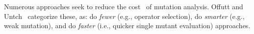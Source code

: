 Numerous approaches seek to reduce the cost~\cite{jia2011analysis} of mutation
analysis. Offutt and Untch~\cite{offutt2001mutation} categorize these,
as: do \textit{fewer} (e.g., operator selection),
do \textit{smarter} (e.g., weak mutation), and do \textit{faster}
(i.e., quicker single mutant
evaluation) approaches. 
